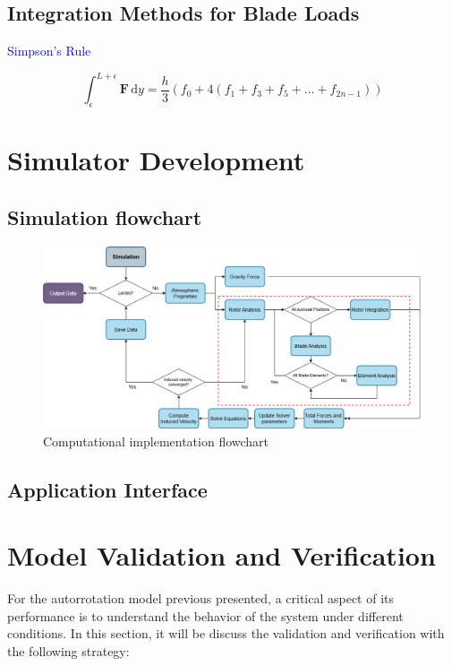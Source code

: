 \subsection{Integration Methods for Blade Loads}

\textcolor{blue}{Simpson's Rule}

\begin{equation}
    \int_\epsilon^{L+\epsilon} \mathbf{F} \,\mathrm{d}y = \frac{h}{3} \left( f_{0} + 4\left(f_{1} + f_{3} + f_{5} + \ldots + f_{2n-1} \right) \right)
\end{equation}


\section{Simulator Development}


\subsection{Simulation flowchart}

\begin{figure}[!htb]
    \centering
    \includegraphics[width=\textwidth]{Figures/comp_method/simulation_flowchart.png}
    \caption{Computational implementation flowchart}
    \label{fig:flowchart}
\end{figure}

\subsection{Application Interface}

\section{Model Validation and Verification}
\label{sec:validation_verification}

For the autorrotation model previous presented, a critical aspect of its performance is to understand the behavior of the system under different conditions. In this section, it will be discuss the validation and verification with the following strategy:

